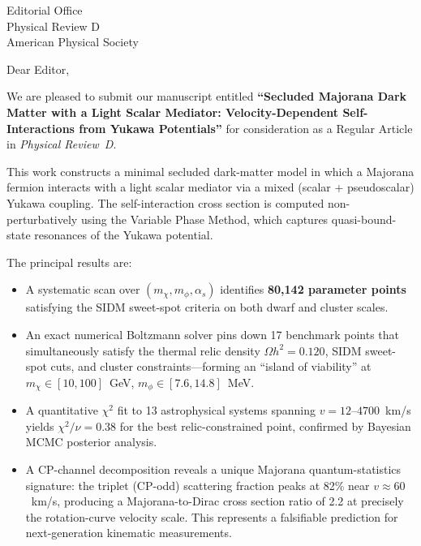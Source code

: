 \documentclass[11pt]{letter}
\begin{document}
\begin{letter}{%
  Editorial Office \\
  Physical Review D \\
  American Physical Society
}

\opening{Dear Editor,}

We are pleased to submit our manuscript entitled
\textbf{``Secluded Majorana Dark Matter with a Light Scalar Mediator:
Velocity-Dependent Self-Interactions from Yukawa Potentials''}
for consideration as a Regular Article in \textit{Physical Review~D}.

This work constructs a minimal secluded dark-matter model in which a
Majorana fermion interacts with a light scalar mediator via a
mixed (scalar + pseudoscalar) Yukawa coupling.  The self-interaction
cross section is computed non-perturbatively using the Variable Phase
Method, which captures quasi-bound-state resonances of the Yukawa
potential.

The principal results are:

\begin{itemize}
  \item A systematic scan over $(m_\chi, m_\phi, \alpha_s)$ identifies
        \textbf{80{,}142 parameter points} satisfying the SIDM
        sweet-spot criteria on both dwarf and cluster scales.

  \item An exact numerical Boltzmann solver pins down 17 benchmark
        points that simultaneously satisfy the thermal relic density
        $\Omega h^2 = 0.120$, SIDM sweet-spot cuts, and cluster
        constraints---forming an ``island of viability'' at
        $m_\chi \in [10, 100]$~GeV, $m_\phi \in [7.6, 14.8]$~MeV.

  \item A quantitative $\chi^2$ fit to 13 astrophysical systems
        spanning $v = 12$--$4700$~km/s yields
        $\chi^2/\nu = 0.38$ for the best relic-constrained point,
        confirmed by Bayesian MCMC posterior analysis.

  \item A CP-channel decomposition reveals a unique Majorana
        quantum-statistics signature: the triplet (CP-odd) scattering
        fraction peaks at 82\% near $v \approx 60$~km/s, producing a
        Majorana-to-Dirac cross section ratio of 2.2 at precisely the
        rotation-curve velocity scale.  This represents a falsifiable
        prediction for next-generation kinematic measurements.


\end{itemize}
\end{letter}
\end{document}
